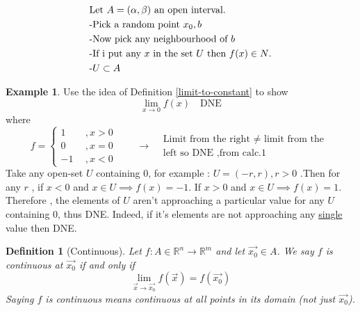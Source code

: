 \documentclass[
	12pt,
	]{article}
\makeatletter
\newcommand{\Rn}{\mathbb{R}^{n}}
\newcommand{\Rm}{\mathbb{R}^{m}}
\theoremstyle{custom}
\theoremstyle{custom}
\theoremstyle{custom}
\theoremstyle{custom}
\newtheorem{definition}{Definition}[section]
\theoremstyle{custom}
\theoremstyle{definition}
\newtheorem{example}{Example}[section]
\theoremstyle{example}
\theoremstyle{note}
\theoremstyle{remark}
\theoremstyle{example}
\newcounter{theo}[section]\setcounter{theo}{0}
\numberwithin{equation}{subsection}
\def\label#1{\@bsphack
			  \protected@write\@auxout{}%
			         {\string\newlabel{#1}{{\@currentlabel}{\thepage}}}%
			  \@esphack}
\makeatother
\begin{document}
	\begin{figure}[h]
		\begin{minipage}[!]{0.45\linewidth}
			\begin{align*}
				\vspace{-1cm}
				&\text{Let $A = (\alpha, \beta)$ an open interval.} \\
				&\text{-Pick a random point $x_{0} ,b$} \\
				&\text{-Now pick any neighbourhood of $b$} \\
				&\text{-If i put any $x$ in the set $U$ then $f(x) \in N$.} \\
				&\text{-$U \subset A$} 
			\end{align*}
		\end{minipage}
		\hfill 
		\begin{minipage}[!]{0.45\linewidth}
		\end{minipage}
	\end{figure}
	\begin{example}
		Use the idea of Definition \eqref{limit-to-constant} to show $$\lim_{x\to 0} f(x) \quad \text{DNE} $$
		where 
		\begin{equation*}
				f = 
			\begin{cases}
				1 \ \ & ,x > 0 \\
				0 \ \ & ,x = 0 \\
				-1 \ \ & ,x < 0
			\end{cases}
			\qquad \to
			\begin{align}
				&\text{Limit from the right $\neq $ limit from the } \\ &\text{left so DNE ,from calc.1} 
			\end{align}
		\end{equation*}
		Take any open-set $U$ containing $0$, for example : $U = (-r, r) , r> 0$ .Then for any $r$ , if $ {x<0 }$ and ${ x \in U  \implies f(x) = -1}$.
		If ${ x>0 }$ and ${x \in U  \implies f(x) = 1}$. Therefore , the elements of $U$ aren't approaching a particular value for any $U$ containing $0$, thus DNE. Indeed, if it's elements are not approaching any \underline{single} value then DNE. 
		\end{example}
		
		\begin{definition}[Continuous]
		\label{continuous}
			Let $f : A \in \Rn \to \Rm $ and let $\vec{x_{0}} \in A $. We say $f$ is continuous at $\vec{x_{0}} $ if and only if 
			\begin{equation} 
			\lim_{\vec{x} \to \vec{x_{0}}} f(\vec{x}) = f(\vec{x_{0}})
			\end{equation}
			Saying $f$ is continuous means continuous at all points in its domain (not just $\vec{x_{0}}$). 
		\end{definition}
		
\end{document}
